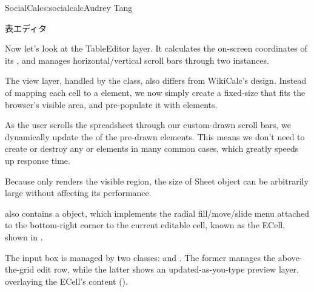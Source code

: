 \begin{aosachapter}{SocialCalc}{s:socialcalc}{Audrey Tang}
\begin{aosasect1}{表エディタ}

Now let's look at the TableEditor layer.  It calculates the on-screen
coordinates of its , and manages
horizontal/vertical scroll bars through two 
instances.


The view layer, handled by the  class, also
differs from WikiCalc's design.  Instead of mapping each cell to a
 element, we now simply create a
fixed-size  that fits the
browser's visible area, and pre-populate it with
 elements.

As the user scrolls the spreadsheet through our custom-drawn scroll
bars, we dynamically update the  of the pre-drawn
 elements.  This means we don't need to
create or destroy any  or
 elements in many common cases,
which greatly speeds up response time.

Because  only renders the visible region, the size
of Sheet object can be arbitrarily large without affecting its
performance.

 also contains a  object, which
implements the radial fill/move/slide menu attached to the
bottom-right corner to the current editable cell, known as the ECell,
shown in .


The input box is managed by two classes:  and
.  The former manages the above-the-grid edit row,
while the latter shows an updated-as-you-type preview layer,
overlaying the ECell's content ().



\end{aosasect1}
\end{aosachapter}
